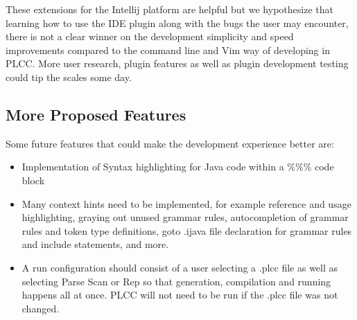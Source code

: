 \documentclass[conference, letterpaper]{IEEEtran}
\begin{document}
These extensions for the Intellij platform are helpful but we hypothesize that learning how to use the IDE plugin along with the bugs the user may encounter, there is not a clear winner on the development simplicity and speed improvements compared to the command line and Vim way of developing in PLCC\@.
More user research, plugin features as well as plugin development testing could tip the scales some day.

\subsection{More Proposed Features}\label{subsec:more-proposed-features}

Some future features that could make the development experience better are:
\begin{itemize}
    \item Implementation of Syntax highlighting for Java code within a \%\%\% code block
    \item Many context hints need to be implemented, for example reference and usage highlighting, graying out unused grammar rules, autocompletion of grammar rules and token type definitions, goto .ijava file declaration for grammar rules and include statements, and more.
    \item A run configuration should consist of a user selecting a .plcc file as well as selecting Parse Scan or Rep so that generation, compilation and running happens all at once.
    PLCC will not need to be run if the .plcc file was not changed.
\end{itemize}

%
%

%
\end{document}
